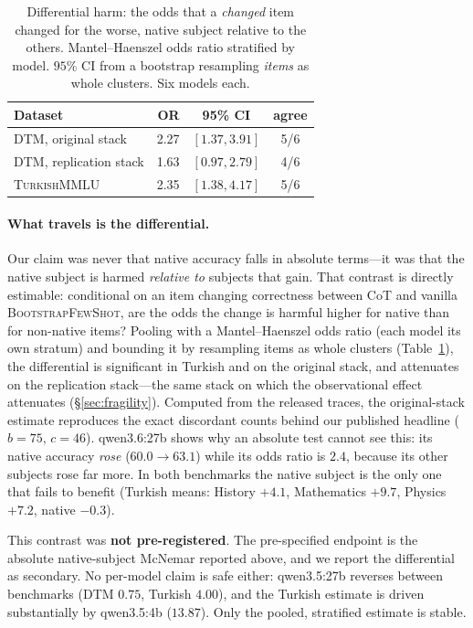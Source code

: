 \documentclass[11pt]{article}
\newcommand{\bsfs}{\textsc{BootstrapFewShot}}
\begin{document}
\begin{table}[t]\centering\small
\caption{Differential harm: the odds that a \emph{changed} item changed for the worse,
native subject relative to the others. Mantel--Haenszel odds ratio stratified by model.
$95\%$ CI from a bootstrap resampling \emph{items} as whole clusters. Six models each.}
\label{tab:differential}
\setlength{\tabcolsep}{4pt}
\begin{tabular}{lrcc}
\toprule
Dataset & OR & 95\% CI & agree \\
\midrule
DTM, original stack    & 2.27 & $[1.37, 3.91]$ & 5/6 \\
DTM, replication stack & 1.63 & $[0.97, 2.79]$ & 4/6 \\
\textsc{TurkishMMLU}   & 2.35 & $[1.38, 4.17]$ & 5/6 \\
\bottomrule
\end{tabular}
\end{table}

\paragraph{What travels is the differential.} Our claim was never that native accuracy
falls in absolute terms---it was that the native subject is harmed \emph{relative to}
subjects that gain. That contrast is directly estimable: conditional on an item changing
correctness between CoT and vanilla \bsfs{}, are the odds the change is harmful higher
for native than for non-native items? Pooling with a Mantel--Haenszel odds ratio (each
model its own stratum) and bounding it by resampling items as whole clusters
(Table~\ref{tab:differential}), the differential is significant in Turkish and on the
original stack, and attenuates on the replication stack---the same stack on which the
observational effect attenuates (\S\ref{sec:fragility}). Computed from the released
traces, the original-stack estimate reproduces the exact discordant counts behind our
published headline ($b{=}75$, $c{=}46$). qwen3.6:27b shows why an absolute test cannot
see this: its native accuracy \emph{rose} ($60.0{\to}63.1$) while its odds ratio is
$2.4$, because its other subjects rose far more. In both benchmarks the native subject
is the only one that fails to benefit (Turkish means: History $+4.1$, Mathematics $+9.7$,
Physics $+7.2$, native $-0.3$).

This contrast was \textbf{not pre-registered}. The pre-specified endpoint is the
absolute native-subject McNemar reported above, and we report the differential as
secondary. No per-model claim is safe either: qwen3.5:27b reverses between benchmarks
(DTM $0.75$, Turkish $4.00$), and the Turkish estimate is driven substantially by
qwen3.5:4b ($13.87$). Only the pooled, stratified estimate is stable.
\end{document}
